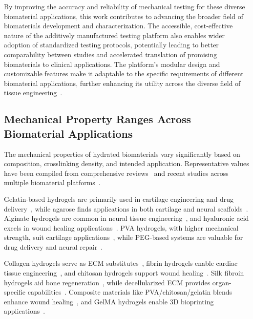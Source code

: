 By improving the accuracy and reliability of mechanical testing for these diverse biomaterial applications, this work contributes to advancing the broader field of biomaterials development and characterization. The accessible, cost-effective nature of the additively manufactured testing platform also enables wider adoption of standardized testing protocols, potentially leading to better comparability between studies and accelerated translation of promising biomaterials to clinical applications. The platform's modular design and customizable features make it adaptable to the specific requirements of different biomaterial applications, further enhancing its utility across the diverse field of tissue engineering~\cite{patel2019systematicreview, chaudhuri2016hydrogelstunable}.

\newpage
\subsection{Mechanical Property Ranges Across\protect\\ Biomaterial Applications}

The mechanical properties of hydrated biomaterials vary significantly based on composition, crosslinking density, and intended application. Representative values have been compiled from comprehensive reviews~\cite{chaudhuri2016hydrogelstunable, antoine2014review} and recent studies across multiple biomaterial platforms~\cite{rowley1999alginatehydrogels, bercea2024recent, nichol2010cellviability, ma2025structurallysophisticated}.

Gelatin-based hydrogels are primarily used in cartilage engineering and drug delivery~\cite{armiento2018biomaterialsarticular}, while agarose finds applications in both cartilage and neural scaffolds~\cite{bahcecioglu2019hydrogelsagarose}. Alginate hydrogels are common in neural tissue engineering~\cite{rowley1999alginatehydrogels}, and hyaluronic acid excels in wound healing applications~\cite{vedadghavami2017manufacturinghydrogel}. PVA hydrogels, with higher mechanical strength, suit cartilage applications~\cite{bercea2024recent}, while PEG-based systems are valuable for drug delivery and neural repair~\cite{nichol2010cellviability}. 

Collagen hydrogels serve as ECM substitutes~\cite{antoine2014review}, fibrin hydrogels enable cardiac tissue engineering~\cite{ma2025structurallysophisticated}, and chitosan hydrogels support wound healing~\cite{yu2019developmentdecellularized}. Silk fibroin hydrogels aid bone regeneration~\cite{mandal2011multilayeredsilk}, while decellularized ECM provides organ-specific capabilities~\cite{yu2019developmentdecellularized}. Composite materials like PVA/chitosan/gelatin blends enhance wound healing~\cite{shamloo2018acceleratedfullthickness}, and GelMA hydrogels enable 3D bioprinting applications~\cite{bahcecioglu20193dprinted}.

